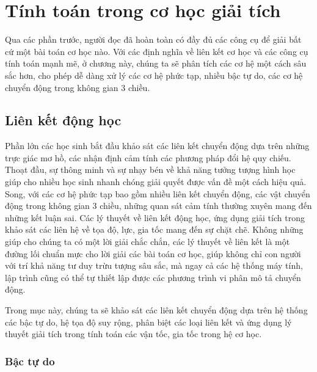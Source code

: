   
\chapter{Tính toán trong cơ học giải tích}
\label{ch:10:Computational_mechanics}

Qua các phần trước, người đọc đã hoàn toàn có đầy đủ các công cụ để giải bất cứ một bài toán cơ học nào. Với các định nghĩa về liên kết cơ học và các công cụ tính toán mạnh mẽ, ở chương này, chúng ta sẽ phân tích các cơ hệ một cách sâu sắc hơn, cho phép dễ dàng xử lý các cơ hệ phức tạp, nhiều bậc tự do, các cơ hệ chuyển động trong không gian 3 chiều.

\section{Liên kết động học} 
\label{sec_10:Kinematic_link}

Phần lớn các học sinh bắt đầu khảo sát các liên kết chuyển động dựa trên những trực giác mơ hồ, các nhận định cảm tính các phương pháp đổi hệ quy chiếu.
Thoạt đầu, sự thông minh và sự nhạy bén về khả năng tưởng tượng hình học giúp cho nhiều học sinh nhanh chóng giải quyết được vấn đề một cách hiệu quả.
Song, với các cơ hệ phức tạp bao gồm nhiều liên kết chuyển động, các vật chuyển động trong không gian 3 chiều, những quan sát cảm tính thường xuyên mang đến những kết luận sai.
Các lý thuyết về liên kết động học, ứng dụng giải tích trong khảo sát các liên hệ về tọa độ, lực, gia tốc mang đến sự chặt chẽ.
Không những giúp cho chúng ta có một lời giải chắc chắn, các lý thuyết về liên kết là một đường lối chuẩn mực cho lời giải các bài toán cơ học, giúp không chỉ con người với trí khả năng tư duy trừu tượng sâu sắc, mà ngay cả các hệ thống máy tính, lập trình cũng có thể tự thiết lập được các phương trình vi phân mô tả chuyển động.

Trong mục này, chúng ta sẽ khảo sát các liên kết chuyển động dựa trên hệ thống các bậc tự do, hệ tọa độ suy rộng, phân biệt các loại liên kết và ứng dụng lý thuyết giải tích trong tính toán các vận tốc, gia tốc trong hệ cơ học.


\subsection{Bậc tự do}

